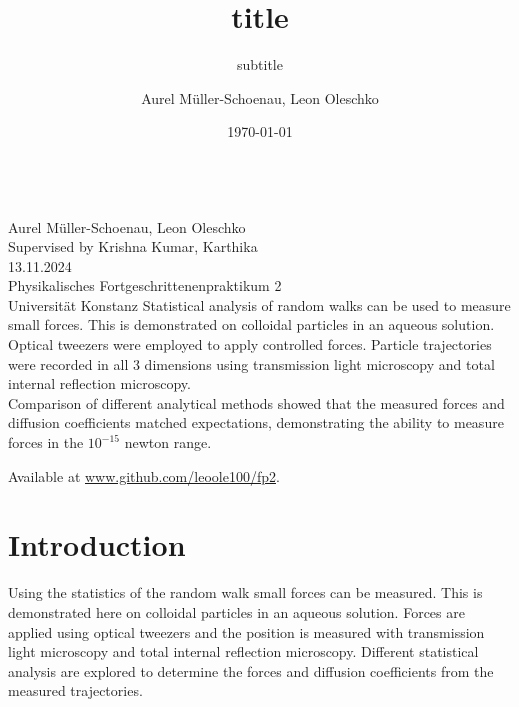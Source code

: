 \documentclass[
    twoside=false,
    twocolumn=true,
    fontsize=11pt,
]{scrarticle}
\begin{document}
\title{title}
\subtitle{subtitle}
\author{Aurel Müller-Schoenau, Leon Oleschko}
\date{\dotdate\today}


\begin{titlepage}
    \sffamily
    \vspace*{3cm}
    {
        \fontsize{32}{32}
    }
    \vspace{.25cm}\\
    {
        \Large
        Aurel Müller-Schoenau, Leon Oleschko\\
        Supervised by Krishna Kumar, Karthika
        \vspace{.05cm}\\
        13.11.2024
        \vspace{.25cm}\\
        \normalsize
        Physikalisches Fortgeschrittenenpraktikum 2\\
        Universität Konstanz
    }
    \vfill
    {
        \normalfont\normalsize
        Statistical analysis of random walks can be used to measure small forces.
        This is demonstrated on colloidal particles in an aqueous solution.
        Optical tweezers were employed to apply controlled forces.
        Particle trajectories were recorded in all 3 dimensions using transmission light microscopy and total internal reflection microscopy. \\
        Comparison of different analytical methods showed that the measured forces and diffusion coefficients matched expectations, demonstrating the ability to measure forces in the $10^{-15}$ newton range.
    }
    \vfill
    \begin{flushright}
        Available at \url{www.github.com/leoole100/fp2}.
    \end{flushright}
\end{titlepage}

\section{Introduction}
Using the statistics of the random walk small forces can be measured.
This is demonstrated here on colloidal particles in an aqueous solution.
Forces are applied using optical tweezers and the position is measured with transmission light microscopy and total internal reflection microscopy.
Different statistical analysis are explored to determine the forces and diffusion coefficients from the measured trajectories.
\end{document}
